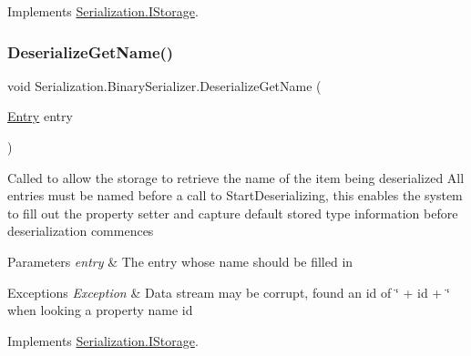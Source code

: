 Implements \hyperlink{interface_serialization_1_1_i_storage_a0b810350295c5e78aca277ce929aaedd}{Serialization.\+I\+Storage}.

\mbox{\label{class_serialization_1_1_binary_serializer_ac02802eda1961199b7e91adce7c33de7}} 
\subsubsection{\texorpdfstring{Deserialize\+Get\+Name()}{DeserializeGetName()}}
{\footnotesize\ttfamily void Serialization.\+Binary\+Serializer.\+Deserialize\+Get\+Name (\begin{DoxyParamCaption}\item[{\hyperlink{class_serialization_1_1_entry}{Entry}}]{entry }\end{DoxyParamCaption})\hspace{0.3cm}{\ttfamily [inline]}}



Called to allow the storage to retrieve the name of the item being deserialized All entries must be named before a call to Start\+Deserializing, this enables the system to fill out the property setter and capture default stored type information before deserialization commences 


\begin{DoxyParams}{Parameters}
{\em entry} & The entry whose name should be filled in\\
\hline
\end{DoxyParams}

\begin{DoxyExceptions}{Exceptions}
{\em Exception} & Data stream may be corrupt, found an id of \char`\"{} + id + \char`\"{} when looking a property name id\\
\hline
\end{DoxyExceptions}


Implements \hyperlink{interface_serialization_1_1_i_storage_ad17a92256ad7a7196084e05bad968567}{Serialization.\+I\+Storage}.

\mbox{\label{class_serialization_1_1_binary_serializer_a93ce28fd88cc7a06daac35287b46664b}} 
